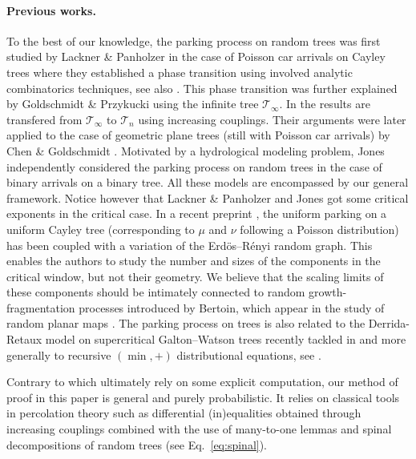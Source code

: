 \paragraph{Previous works.} To the best of our knowledge, the parking process on random trees was first studied by Lackner \& Panholzer \cite{LaP16} in the case of Poisson car arrivals on Cayley trees where they established a phase transition using involved analytic combinatorics techniques, see also \cite{P20}. This phase transition was further explained by Goldschmidt \& Przykucki \cite{GP19} using the infinite tree $ \mathcal{T}_\infty$. In \cite{GP19} the results are transfered from $ \mathcal{T}_\infty$ to $ \mathcal{T}_n$ using increasing couplings. Their arguments were later applied to the case of geometric plane trees (still with Poisson car arrivals) by Chen \& Goldschmidt \cite{CG19}. Motivated by a hydrological modeling problem, Jones \cite{JO18} independently considered the parking process on random trees in the case of binary arrivals on a binary tree. All these models are  encompassed by our general framework. Notice however that Lackner \& Panholzer \cite{LaP16} and Jones \cite{JO18} got some critical exponents in the critical case.
In a recent preprint \cite{CC20}, the uniform parking on a uniform Cayley tree (corresponding to $\mu$ and $\nu$ following a Poisson distribution) has been coupled with a variation of the Erd\"os--R\'enyi random graph. This enables the authors to study the number and sizes of the components in the critical window, but not their geometry.
We believe that the scaling limits of these components should be intimately connected to random growth-fragmentation processes introduced by  Bertoin, which appear in the study of random planar maps \cite{BCK18}. The parking process on trees is also related to the Derrida-Retaux model on supercritical Galton--Watson trees recently tackled in \cite{HMP19} and more generally to recursive $(\min,+)$ distributional equations, see \cite{AB05}.

\medskip 
Contrary to \cite{LaP16,CG19,GP19} which ultimately rely on some explicit computation, our method of proof in this paper is general and purely probabilistic. {It relies on classical tools in percolation theory such as differential (in)equalities obtained through increasing couplings combined with the use of many-to-one lemmas and  spinal decompositions of random trees  (see Eq.~\eqref{eq:spinal}).} %
\medskip 






